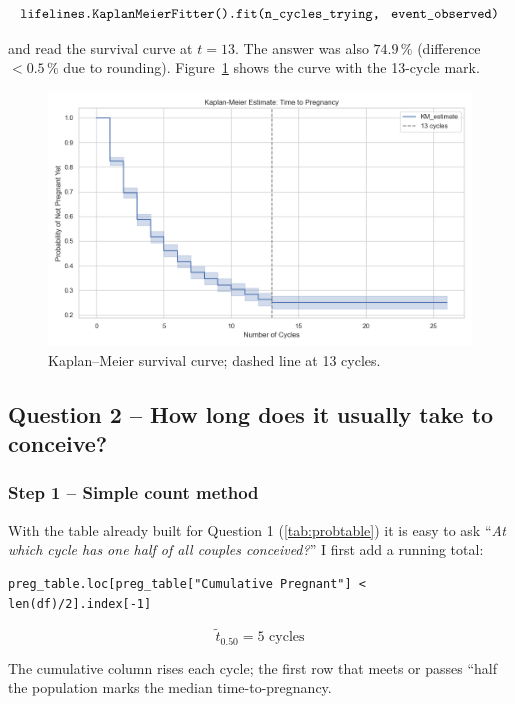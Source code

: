 \documentclass[11pt,a4paper]{article}
\begin{document}
\[
\texttt{lifelines.KaplanMeierFitter().fit(n\_cycles\_trying,\; event\_observed)}
\]

and read the survival curve at \(t=13\).  
The answer was also \(74.9\,\%\) (difference $<0.5\,\%$ due to rounding).  
Figure~\ref{fig:km13} shows the curve with the 13-cycle mark.

\begin{figure}[htbp!]
  \centering
  \includegraphics[width=0.8\linewidth]{../results/Kaplan_meier_13.png}
  \caption{Kaplan–Meier survival curve; dashed line at 13 cycles.}
  \label{fig:km13}
\end{figure}
\FloatBarrier


\subsection{Question 2 – How long does it usually take to conceive?}

\subsubsection{Step 1 – Simple count method}
With the table already built for Question 1 (\ref{tab:probtable}) it is easy to ask  
“\emph{At which cycle has one half of all couples conceived?}”
I first add a running total:

\begin{center}
\begin{minipage}{0.9\linewidth}
\begin{verbatim}
preg_table.loc[preg_table["Cumulative Pregnant"] < len(df)/2].index[-1]
\end{verbatim}
\end{minipage}
\end{center}

\[
\boxed{\tilde{t}_{0.50} = 5\text{ cycles}}
\]

The cumulative column rises each cycle; the first row that meets or passes
“half the population marks the median time-to-pregnancy.
\end{document}
